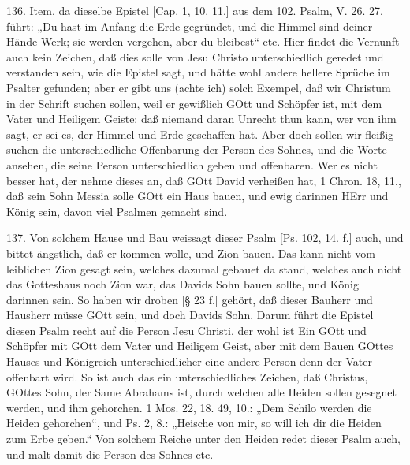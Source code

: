136. Item, da dieselbe Epistel [Cap. 1, 10. 11.] aus dem 102. Psalm, V. 26. 27. führt: „Du hast im Anfang die Erde gegründet, und die Himmel sind deiner Hände Werk; sie werden vergehen, aber du bleibest“ etc. Hier findet die Vernunft auch kein Zeichen, daß dies solle von Jesu Christo unterschiedlich geredet und verstanden sein, wie die Epistel sagt, und hätte wohl andere hellere Sprüche im Psalter gefunden; aber er gibt uns (achte ich) solch Exempel, daß wir Christum in der Schrift suchen sollen, weil er gewißlich GOtt und Schöpfer ist, mit dem Vater und Heiligem Geiste; daß niemand daran Unrecht thun kann, wer von ihm sagt, er sei es, der Himmel und Erde geschaffen hat. Aber doch sollen wir fleißig suchen die unterschiedliche Offenbarung der Person des Sohnes, und die Worte ansehen, die seine Person unterschiedlich geben und offenbaren. Wer es nicht besser hat, der nehme dieses an, daß GOtt David verheißen hat, 1 Chron. 18, 11., daß sein Sohn Messia solle GOtt ein Haus bauen, und ewig darinnen HErr und König sein, davon viel Psalmen gemacht sind.

137. Von solchem Hause und Bau weissagt dieser Psalm [Ps. 102, 14. f.] auch, und bittet ängstlich, daß er kommen wolle, und Zion bauen. Das kann nicht vom leiblichen Zion gesagt sein, welches dazumal gebauet da stand, welches auch nicht das Gotteshaus noch Zion war, das Davids Sohn bauen sollte, und König darinnen sein. So haben wir droben [§ 23 f.] gehört, daß dieser Bauherr und Hausherr müsse GOtt
sein, und doch Davids Sohn. Darum führt die Epistel diesen Psalm recht auf die Person Jesu Christi, der wohl ist Ein GOtt und Schöpfer mit GOtt dem Vater und Heiligem Geist, aber mit dem Bauen GOttes Hauses und Königreich unterschiedlicher eine andere Person denn der Vater offenbart wird. So ist auch das ein unterschiedliches Zeichen, daß Christus, GOttes Sohn, der Same Abrahams ist, durch welchen alle Heiden sollen gesegnet werden, und ihm gehorchen. 1 Mos. 22, 18. 49, 10.: „Dem Schilo werden die Heiden gehorchen“, und Ps. 2, 8.: „Heische von mir, so will ich dir die Heiden zum Erbe geben.“ Von solchem Reiche unter den Heiden redet dieser Psalm auch, und malt damit die Person des Sohnes etc.

